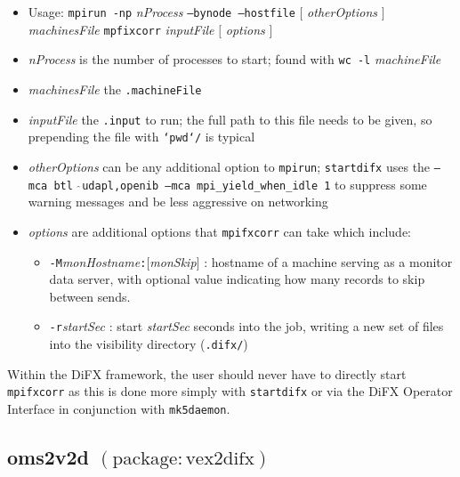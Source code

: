 \begin{itemize}
\item[] Usage: {\tt mpirun -np} {\em nProcess} {\tt --bynode --hostfile} $[$ {\em otherOptions} $]$ {\em machinesFile} {\tt mpfixcorr} {\em inputFile} $[$ {\em options} $]$
\item[] {\em nProcess} is the number of processes to start; found with {\tt wc -l} {\em machineFile}
\item[] {\em machinesFile} the {\tt .machineFile}
\item[] {\em inputFile} the {\tt .input} to run; the full path to this file needs to be given, so prepending the file with {\tt `pwd`/} is typical
\item[] {\em otherOptions} can be any additional option to {\tt mpirun}; {\tt startdifx} uses the {\tt --mca btl $\hat{\ }$udapl,openib --mca mpi\_yield\_when\_idle 1} to suppress some warning messages and be less aggressive on networking
\item[] {\em options} are additional options that {\tt mpifxcorr} can take which include:
\begin{itemize}
\item[] {\tt -M}{\em monHostname}{\tt :}$[${\em monSkip}$]$ : hostname of a machine serving as a monitor data server, with optional value indicating how many records to skip between sends.
\item[] {\tt -r}{\em startSec} : start {\em startSec} seconds into the job, writing a new set of files into the visibility directory ({\tt .difx/})
\end{itemize}
\end{itemize}

Within the DiFX framework, the user should never have to directly start {\tt mpifxcorr} as this is done more simply with {\tt startdifx} or via the DiFX Operator Interface in conjunction with {\tt mk5daemon}.










\subsection{oms2v2d {\small $\mathrm{(package: vex2difx)}$} \label{sec:oms2v2d}}

